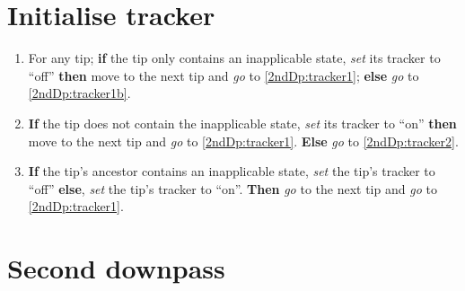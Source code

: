 \documentclass[a4paper,12pt]{article}
\begin{document}
\section{Initialise tracker}

\begin{enumerate}
    \item \label{2ndDp:tracker1} For any tip; \textbf{if} the tip only contains an inapplicable state, \textit{set} its tracker to ``off'' \textbf{then} move to the next tip and \textit{go} to \ref{2ndDp:tracker1}; \textbf{else} \textit{go} to \ref{2ndDp:tracker1b}.
    \item \label{2ndDp:tracker1b} \textbf{If} the tip does not contain the inapplicable state, \textit{set} its tracker to ``on'' \textbf{then} move to the next tip and \textit{go} to \ref{2ndDp:tracker1}. \textbf{Else} \textit{go} to \ref{2ndDp:tracker2}.
    \item \label{2ndDp:tracker2} \textbf{If} the tip's ancestor contains an inapplicable state, \textit{set} the tip's tracker to ``off'' \textbf{else}, \textit{set} the tip's tracker to ``on''. \textbf{Then} \textit{go} to the next tip and \textit{go} to \ref{2ndDp:tracker1}.
\end{enumerate}

\section{Second downpass} \label{2ndDp}
\end{document}
